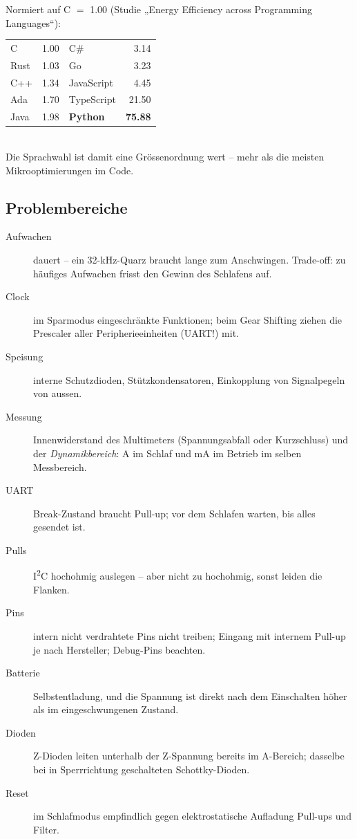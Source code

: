 \begin{bsp}
Normiert auf C $=$ 1.00 (Studie „Energy Efficiency across Programming
Languages“):
\begin{tabular}{@{}lr@{\hskip8pt}lr@{}}
C & 1.00 & C\# & 3.14 \\
Rust & 1.03 & Go & 3.23 \\
C++ & 1.34 & JavaScript & 4.45 \\
Ada & 1.70 & TypeScript & 21.50 \\
Java & 1.98 & \textbf{Python} & \textbf{75.88} \\
\end{tabular}\\[2pt]
Die Sprachwahl ist damit eine Grössenordnung wert -- mehr als die
meisten Mikrooptimierungen im Code.
\end{bsp}

\subsection{Problembereiche}
\label{falle:pwr}
\begin{falle}
\begin{description}
\item[Aufwachen] dauert -- ein 32-kHz-Quarz braucht lange zum
  Anschwingen. Trade-off: zu häufiges Aufwachen frisst den Gewinn des
  Schlafens auf.
\item[Clock] im Sparmodus eingeschränkte Funktionen; beim Gear Shifting
  ziehen die Prescaler aller Peripherieeinheiten (UART!) mit.
\item[Speisung] interne Schutzdioden, Stützkondensatoren, Einkopplung
  von Signalpegeln von aussen.
\item[Messung] Innenwiderstand des Multimeters (Spannungsabfall oder
  Kurzschluss) und der \emph{Dynamikbereich}: \textmu A im Schlaf und
  mA im Betrieb im selben Messbereich.
\item[UART] Break-Zustand braucht Pull-up; vor dem Schlafen warten, bis
  alles gesendet ist.
\item[Pulls] I\textsuperscript{2}C hochohmig auslegen -- aber nicht zu
  hochohmig, sonst leiden die Flanken.
\item[Pins] intern nicht verdrahtete Pins nicht treiben; Eingang mit
  internem Pull-up je nach Hersteller; Debug-Pins beachten.
\item[Batterie] Selbstentladung, und die Spannung ist direkt nach dem
  Einschalten höher als im eingeschwungenen Zustand.
\item[Dioden] Z-Dioden leiten unterhalb der Z-Spannung bereits im
  \textmu A-Bereich; dasselbe bei in Sperrrichtung geschalteten
  Schottky-Dioden.
\item[Reset] im Schlafmodus empfindlich gegen elektrostatische
  Aufladung \ra Pull-ups und Filter.
\end{description}
\end{falle}
